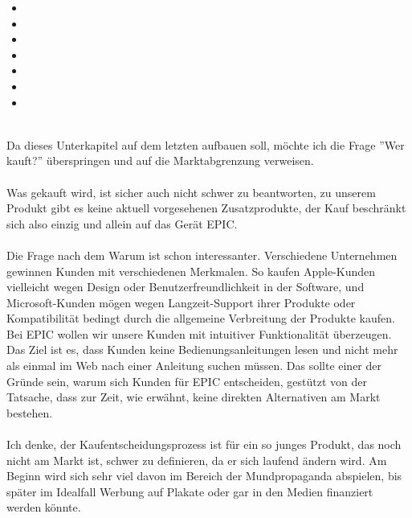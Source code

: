 \begin{itemize}
	\item {}        
	\item {}              
	\item {}            
	\item {}              
	\item {}         
	\item {}             
	\item {}  
\end{itemize}
\ \\
Da dieses Unterkapitel auf dem letzten aufbauen soll, möchte ich die Frage ''Wer kauft?'' überspringen und auf die Marktabgrenzung verweisen.\\
\\
Was gekauft wird, ist sicher auch nicht schwer zu beantworten, zu unserem Produkt gibt es keine aktuell vorgesehenen Zusatzprodukte, der Kauf beschränkt sich also einzig und allein auf das Gerät EPIC.\\
\\
Die Frage nach dem Warum ist schon interessanter. Verschiedene Unternehmen gewinnen Kunden mit verschiedenen Merkmalen. So kaufen Apple-Kunden vielleicht wegen Design oder Benutzerfreundlichkeit in der Software, und Microsoft-Kunden mögen wegen Langzeit-Support ihrer Produkte oder Kompatibilität bedingt durch die allgemeine Verbreitung der Produkte kaufen. Bei EPIC wollen wir unsere Kunden mit intuitiver Funktionalität überzeugen. Das Ziel ist es, dass Kunden keine Bedienungsanleitungen lesen und nicht mehr als einmal im Web nach einer Anleitung suchen müssen. Das sollte einer der Gründe sein, warum sich Kunden für EPIC entscheiden, gestützt von der Tatsache, dass zur Zeit, wie erwähnt, keine direkten Alternativen am Markt bestehen.\\
\\
Ich denke, der Kaufentscheidungsprozess ist für ein so junges Produkt, das noch nicht am Markt ist, schwer zu definieren, da er sich laufend ändern wird. Am Beginn wird sich sehr viel davon im Bereich der Mundpropaganda abspielen, bis später im Idealfall Werbung auf Plakate oder gar in den Medien finanziert werden könnte.\\
